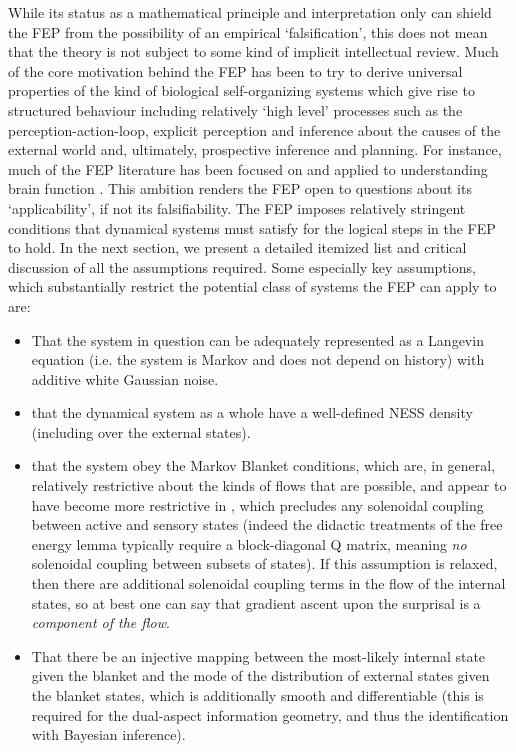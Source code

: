 While its status as a mathematical principle and interpretation only can shield the FEP from the possibility of an empirical `falsification', this does not mean that the theory is not subject to some kind of implicit intellectual review. Much of the core motivation behind the FEP has been to try to derive universal properties of the kind of biological self-organizing systems which give rise to structured behaviour including relatively `high level' processes such as the perception-action-loop, explicit perception and inference about the causes of the external world and, ultimately, prospective inference and planning. For instance, much of the FEP literature has been focused on and applied to understanding brain function \citep{friston2008hierarchical,friston2015active,friston2017process}. This ambition renders the FEP open to questions about its `applicability', if not its falsifiability. The FEP imposes relatively stringent conditions that dynamical systems must satisfy for the logical steps in the FEP to hold. In the next section, we present a detailed itemized list and critical discussion of all the assumptions required. Some especially key assumptions, which substantially restrict the potential class of systems the FEP can apply to are:
\begin{itemize}
\item That the system in question can be adequately represented as a Langevin equation (i.e. the system is Markov and does not depend on history) with additive white Gaussian noise.
\item that the dynamical system as a whole have a well-defined NESS density (including over the external states).
\item that the system obey the Markov Blanket conditions, which are, in general, relatively restrictive about the kinds of flows that are possible, and appear to have become more restrictive in \citet{friston2020some}, which precludes any solenoidal coupling between active and sensory states (indeed the didactic treatments of the free energy lemma typically require a block-diagonal Q matrix, meaning \emph{no} solenoidal coupling between subsets of states). If this assumption is relaxed, then there are additional solenoidal coupling terms in the flow of the internal states, so at best one can say that gradient ascent upon the surprisal is a \emph{component of the flow}.
\item That there be an injective mapping between the most-likely internal state given the blanket and the mode of the distribution of external states given the blanket states, which is additionally smooth and differentiable (this is required for the dual-aspect information geometry, and thus the identification with Bayesian inference).
\end{itemize}
